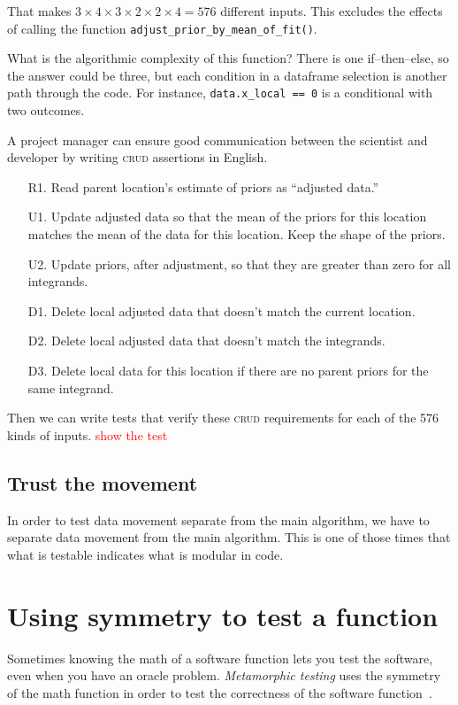 \documentclass[fleqn,10pt]{olplainarticle}
\newcommand{\aside}[1]{\textcolor{red}{#1}}
\begin{document}
That makes $3\times 4 \times 3\times 2\times 2\times 4=576$ different inputs.
This excludes the effects of calling the function
\lstinline!adjust_prior_by_mean_of_fit()!.

What is the algorithmic complexity of this function? There is one
if--then--else, so the answer could be three, but each condition in a dataframe
selection is another path through the code. For instance,
\lstinline!data.x_local == 0! is a conditional with two outcomes.

A project manager can ensure good communication between the scientist and
developer by writing \textsc{crud} assertions in English.
\begin{itemize}
    \item[R1.] Read parent location's estimate of priors as ``adjusted data.''
    \item[U1.] Update adjusted data so that the mean of the priors for this location matches
        the mean of the data for this location. Keep the shape of the priors.
    \item[U2.] Update priors, after adjustment, so that they are greater
        than zero for all integrands.
    \item[D1.] Delete local adjusted data that doesn't match the current location.
    \item[D2.] Delete local adjusted data that doesn't match the integrands.
    \item[D3.] Delete local data for this location if there are no parent
        priors for the same integrand.
\end{itemize}
Then we can write tests that verify these \textsc{crud} requirements for
each of the 576 kinds of inputs. \aside{show the test}


\subsection{Trust the movement}

In order to test data movement separate from the main algorithm,
we have to separate data movement from the main algorithm.
This is one of those times that what is testable indicates what
is modular in code.


\section{Using symmetry to test a function}\label{sec:symmetry-test}

Sometimes knowing the math of a software function lets you
test the software, even when you have an oracle problem.
\emph{Metamorphic testing} uses the symmetry of the math function
in order to test the correctness of the software function~\cite{ding2016,guderlei2007,kanewala2015,liu2014}.
\end{document}
